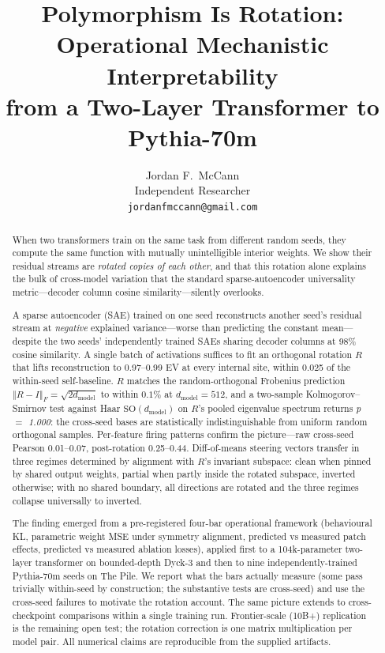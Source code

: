 \documentclass[11pt,letterpaper]{article}
\title{Polymorphism Is Rotation: Operational Mechanistic Interpretability \\ from a Two-Layer Transformer to Pythia-70m}
\author{Jordan F.\ McCann \\
  Independent Researcher \\
  \texttt{jordanfmccann@gmail.com}}
\date{}
\newcommand{\dmodel}{d_{\mathrm{model}}}
\newcommand{\R}{R}
\newcommand{\frobnorm}[1]{\left\Vert #1 \right\Vert_F}
\begin{document}
\maketitle

\begin{abstract}
When two transformers train on the same task from different random seeds, they compute the same function with mutually unintelligible interior weights. We show their residual streams are \emph{rotated copies of each other}, and that this rotation alone explains the bulk of cross-model variation that the standard sparse-autoencoder universality metric---decoder column cosine similarity---silently overlooks.

A sparse autoencoder (SAE) trained on one seed reconstructs another seed's residual stream at \emph{negative} explained variance---worse than predicting the constant mean---despite the two seeds' independently trained SAEs sharing decoder columns at 98\% cosine similarity. A single batch of activations suffices to fit an orthogonal rotation $\R$ that lifts reconstruction to 0.97--0.99 EV at every internal site, within 0.025 of the within-seed self-baseline. $\R$ matches the random-orthogonal Frobenius prediction $\frobnorm{\R - I} = \sqrt{2\dmodel}$ to within $0.1\%$ at $\dmodel = 512$, and a two-sample Kolmogorov--Smirnov test against Haar $\mathrm{SO}(\dmodel)$ on $\R$'s pooled eigenvalue spectrum returns \emph{p $=$ 1.000}: the cross-seed bases are statistically indistinguishable from uniform random orthogonal samples. Per-feature firing patterns confirm the picture---raw cross-seed Pearson 0.01--0.07, post-rotation 0.25--0.44. Diff-of-means steering vectors transfer in three regimes determined by alignment with $\R$'s invariant subspace: clean when pinned by shared output weights, partial when partly inside the rotated subspace, inverted otherwise; with no shared boundary, all directions are rotated and the three regimes collapse universally to inverted.

The finding emerged from a pre-registered four-bar operational framework (behavioural KL, parametric weight MSE under symmetry alignment, predicted vs measured patch effects, predicted vs measured ablation losses), applied first to a 104k-parameter two-layer transformer on bounded-depth Dyck-3 and then to nine independently-trained Pythia-70m seeds on The Pile. We report what the bars actually measure (some pass trivially within-seed by construction; the substantive tests are cross-seed) and use the cross-seed failures to motivate the rotation account. The same picture extends to cross-checkpoint comparisons within a single training run. Frontier-scale (10B+) replication is the remaining open test; the rotation correction is one matrix multiplication per model pair. All numerical claims are reproducible from the supplied artifacts.
\end{abstract}
\end{document}
